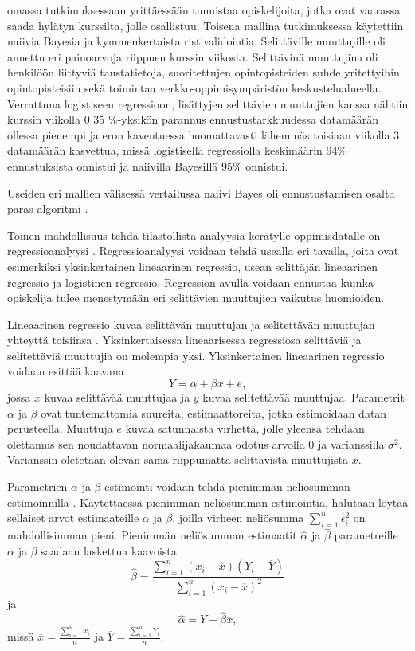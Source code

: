 \citet{barberCourseCorrectionUsing2012} omassa tutkimuksessaan yrittäessään tunnistaa opiskelijoita, jotka ovat vaarassa saada hylätyn kurssilta, jolle osallistuu. Toisena mallina tutkimuksessa käytettiin naiivia Bayesia ja kymmenkertaista ristivalidointia. Selittäville muuttujille oli annettu eri painoarvoja riippuen kurssin viikosta. Selittävinä muuttujina oli henkilöön liittyviä taustatietoja, suoritettujen opintopisteiden suhde yritettyihin opintopisteisiin sekä toimintaa verkko-oppimisympäristön keskustelualueella. Verrattuna logistiseen regressioon, lisättyjen selittävien muuttujien kanssa nähtiin kurssin viikolla 0 35 \%-yksikön parannus ennustustarkkuudessa datamäärän ollessa pienempi ja eron kaventuessa huomattavasti lähemmäs toisiaan viikolla 3 datamäärän kasvettua, missä logistisella regressiolla keskimäärin 94\% ennustuksista onnistui ja naiivilla Bayesillä 95\% onnistui.

\color{red}
Useiden eri mallien välisessä vertailussa naiivi Bayes oli ennustustamisen osalta paras algoritmi \citep{kotsiantisPREDICTINGSTUDENTSPERFORMANCE2004}.
\color{black}

Toinen mahdollisuus tehdä tilastollista analyysia kerätylle oppimisdatalle on regressioanalyysi \citep{songLearningAnalyticsEducational2018, romeroEducationalDataMining2010, papamitsiouLearningAnalyticsEducational2014}. Regressioanalyysi voidaan tehdä usealla eri tavalla, joita ovat esimerkiksi yksinkertainen lineaarinen regressio, usean selittäjän lineaarinen regressio ja logistinen regressio. Regression avulla voidaan ennustaa kuinka opiskelija tulee menestymään eri selittävien muuttujien vaikutus huomioiden.

Lineaarinen regressio kuvaa selittävän muuttujan ja selitettävän muuttujan yhteyttä toisiinsa \citep{rossIntroductoryStatistics2017}. Yksinkertaisessa lineaarisessa regressiosa selittäviä ja selitettäviä muuttujia on molempia yksi. Yksinkertainen lineaarinen regressio voidaan esittää kaavana $$Y = \alpha + \beta x + e,$$ jossa $x$ kuvaa selittävää muuttujaa ja $y$ kuvaa selitettävää muuttujaa. Parametrit $\alpha$ ja $\beta$ ovat tuntemattomia suureita, estimaattoreita, jotka estimoidaan datan perusteella.  Muuttuja $e$ kuvaa satunnaista virhettä, jolle yleensä tehdään olettamus sen noudattavan normaalijakaumaa odotus arvolla $0$ ja varianssilla $\sigma^2$. Varianssin oletetaan olevan sama riippumatta selittävistä muuttujista $x$.

Parametrien $\alpha$ ja $\beta$ estimointi voidaan tehdä pienimmän neliösumman estimoinnilla \citep{rossIntroductoryStatistics2017}. Käytettäessä pienimmän neliösumman estimointia, halutaan löytää sellaiset arvot estimaateille $\alpha$ ja $\beta$, joilla virheen neliösumma $\sum^n_{i=1} \epsilon^2_i$ on mahdollisimman pieni. Pienimmän neliösumman estimaatit $\hat{\alpha}$ ja $\hat{\beta}$ parametreille $\alpha$ ja $\beta$ saadaan laskettua kaavoista $$\hat{\beta} = \frac{\sum^n_{i=1}(x_i - \overline{x})(Y_i - \overline{Y})}{\sum^n_{i=1}(x_i - \overline{x})^2}$$ ja $$\hat{\alpha} = \overline{Y} - \hat{\beta}\overline{x},$$ missä $\overline{x} = \frac{\sum^n_{i=1}x_i}{n}$ ja $\overline{Y} = \frac{\sum^n_{i=1}Y_i}{n}$.

